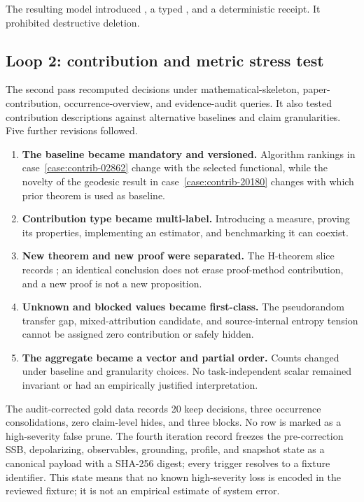 The resulting model introduced \ClaimMathGrounding{}, a typed \SemanticClaimRelation{}, and a deterministic \ClaimView{} receipt. It prohibited destructive deletion.

\subsection{Loop 2: contribution and metric stress test}

The second pass recomputed decisions under mathematical-skeleton, paper-contribution, occurrence-overview, and evidence-audit queries. It also tested contribution descriptions against alternative baselines and claim granularities. Five further revisions followed.

\begin{enumerate}
  \item \textbf{The baseline became mandatory and versioned.} Algorithm rankings in case~\ref{case:contrib-02862} change with the selected functional, while the novelty of the geodesic result in case~\ref{case:contrib-20180} changes with which prior theorem is used as baseline.
  \item \textbf{Contribution type became multi-label.} Introducing a measure, proving its properties, implementing an estimator, and benchmarking it can coexist.
  \item \textbf{New theorem and new proof were separated.} The H-theorem slice records ; an identical conclusion does not erase proof-method contribution, and a new proof is not a new proposition.
  \item \textbf{Unknown and blocked values became first-class.} The pseudorandom transfer gap, mixed-attribution candidate, and source-internal entropy tension cannot be assigned zero contribution or safely hidden.
  \item \textbf{The aggregate became a vector and partial order.} Counts changed under baseline and granularity choices. No task-independent scalar remained invariant or had an empirically justified interpretation.
\end{enumerate}

The audit-corrected gold data records 20 keep decisions, three occurrence consolidations, zero claim-level hides, and three blocks. No row is marked as a high-severity false prune. The fourth iteration record freezes the pre-correction SSB, depolarizing, observables, grounding, profile, and snapshot state as a canonical payload with a SHA-256 digest; every trigger resolves to a fixture identifier. This state means that no known high-severity loss is encoded in the reviewed fixture; it is not an empirical estimate of system error.

